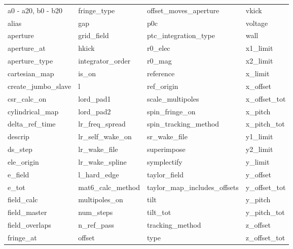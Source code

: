  \begin{tabular}{llll} \toprule
a0 - a20, b0 - b20          & fringe_type                 & offset_moves_aperture       & vkick                       \\
alias                       & gap                         & p0c                         & voltage                     \\
aperture                    & grid_field                  & ptc_integration_type        & wall                        \\
aperture_at                 & hkick                       & r0_elec                     & x1_limit                    \\
aperture_type               & integrator_order            & r0_mag                      & x2_limit                    \\
cartesian_map               & is_on                       & reference                   & x_limit                     \\
create_jumbo_slave          & l                           & ref_origin                  & x_offset                    \\
csr_calc_on                 & lord_pad1                   & scale_multipoles            & x_offset_tot                \\
cylindrical_map             & lord_pad2                   & spin_fringe_on              & x_pitch                     \\
delta_ref_time              & lr_freq_spread              & spin_tracking_method        & x_pitch_tot                 \\
descrip                     & lr_self_wake_on             & sr_wake_file                & y1_limit                    \\
ds_step                     & lr_wake_file                & superimpose                 & y2_limit                    \\
ele_origin                  & lr_wake_spline              & symplectify                 & y_limit                     \\
e_field                     & l_hard_edge                 & taylor_field                & y_offset                    \\
e_tot                       & mat6_calc_method            & taylor_map_includes_offsets & y_offset_tot                \\
field_calc                  & multipoles_on               & tilt                        & y_pitch                     \\
field_master                & num_steps                   & tilt_tot                    & y_pitch_tot                 \\
field_overlaps              & n_ref_pass                  & tracking_method             & z_offset                    \\
fringe_at                   & offset                      & type                        & z_offset_tot                \\
 \bottomrule
 \end{tabular}
 \vfill
 
